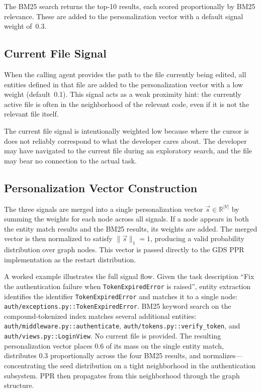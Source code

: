The BM25 search returns the top-10 results, each scored proportionally by BM25 relevance. These are added to the personalization vector with a default signal weight of~0.3.


\subsection{Current File Signal}
\label{sec:current-file-signal}

When the calling agent provides the path to the file currently being edited, all entities defined in that file are added to the personalization vector with a low weight (default~0.1). This signal acts as a weak proximity hint: the currently active file is often in the neighborhood of the relevant code, even if it is not the relevant file itself.

The current file signal is intentionally weighted low because where the cursor is does not reliably correspond to what the developer cares about. The developer may have navigated to the current file during an exploratory search, and the file may bear no connection to the actual task.


\subsection{Personalization Vector Construction}
\label{sec:pvec-construction}

The three signals are merged into a single personalization vector $\vec{s} \in \mathbb{R}^{|V|}$ by summing the weights for each node across all signals. If a node appears in both the entity match results and the BM25 results, its weights are added. The merged vector is then normalized to satisfy $\|\vec{s}\|_1 = 1$, producing a valid probability distribution over graph nodes. This vector is passed directly to the GDS PPR implementation as the restart distribution.

A worked example illustrates the full signal flow. Given the task description ``Fix the authentication failure when \texttt{TokenExpiredError} is raised'', entity extraction identifies the identifier \texttt{TokenExpiredError} and matches it to a single node: \texttt{auth/exceptions.py::TokenExpiredError}. BM25 keyword search on the compound-tokenized index matches several additional entities: \texttt{auth/middleware.py::authenticate}, \texttt{auth/tokens.py::verify\_token}, and \texttt{auth/views.py::LoginView}. No current file is provided. The resulting personalization vector places 0.6 of its mass on the single entity match, distributes 0.3 proportionally across the four BM25 results, and normalizes---concentrating the seed distribution on a tight neighborhood in the authentication subsystem. PPR then propagates from this neighborhood through the graph structure.

